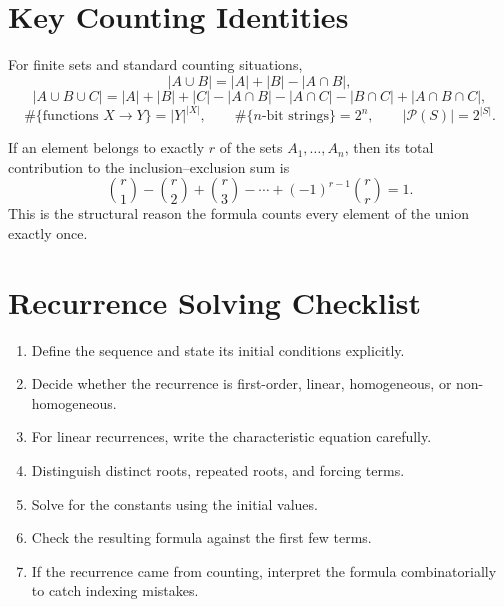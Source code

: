 \documentclass[12pt]{article}
\begin{document}
\section{Key Counting Identities}

\begin{keyformula}[title={Core identities from Part I}]
For finite sets and standard counting situations,
\[
|A\cup B|=|A|+|B|-|A\cap B|,
\]
\[
|A\cup B\cup C|
=
|A|+|B|+|C|
-|A\cap B|-|A\cap C|-|B\cap C|
+|A\cap B\cap C|,
\]
\[
\#\{\text{functions }X\to Y\}=|Y|^{|X|},
\qquad
\#\{\text{$n$-bit strings}\}=2^n,
\qquad
|\mathcal{P}(S)|=2^{|S|}.
\]
\end{keyformula}

\begin{extension}[title={Alternating signs in inclusion--exclusion}]
If an element belongs to exactly $r$ of the sets $A_1,\dots,A_n$, then its total contribution to the inclusion--exclusion sum is
\[
\binom{r}{1}-\binom{r}{2}+\binom{r}{3}-\cdots+(-1)^{r-1}\binom{r}{r}=1.
\]
This is the structural reason the formula counts every element of the union exactly once.
\end{extension}

\section{Recurrence Solving Checklist}

\begin{enumerate}[leftmargin=*]
    \item Define the sequence and state its initial conditions explicitly.
    \item Decide whether the recurrence is first-order, linear, homogeneous, or non-homogeneous.
    \item For linear recurrences, write the characteristic equation carefully.
    \item Distinguish distinct roots, repeated roots, and forcing terms.
    \item Solve for the constants using the initial values.
    \item Check the resulting formula against the first few terms.
    \item If the recurrence came from counting, interpret the formula combinatorially to catch indexing mistakes.
\end{enumerate}
\end{document}
